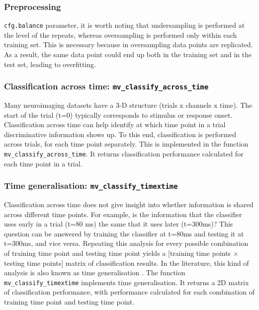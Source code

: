 \documentclass[utf8]{frontiersSCNS} %
\newcommand{\ttt}[1]{\texttt{#1}}
\begin{document}
\subsubsection{Preprocessing}\label{sec:preprocessing}

\ttt{cfg.balance} parameter, it is worth noting that undersampling is performed at the level of the repeats, whereas oversampling is performed only within each training set. This is necessary because in oversampling data points are  replicated. As a result, the same data point could end up both in the training set and in the test set, leading to overfitting.


\subsubsection{Classification across time: \ttt{mv\_classify\_across\_time}}

Many neuroimaging datasets have a 3-D structure (trials x channels x time). The start of the trial (t=0) typically corresponds to stimulus or response onset. Classification across time can help identify at which time point in a trial discriminative information shows up. To this end, classification is performed across trials, for each time point separately. This is implemented in the function \ttt{mv\_classify\_across\_time}. It returns classification performance calculated for each time point in a trial.


\subsubsection{Time generalisation: \ttt{mv\_classify\_timextime}}

Classification across time does not give insight into whether information is shared across different time points. For example, is the information that the classifier uses early in a trial (t=80 ms) the same that it uses later (t=300ms)? This question can be answered by training the classifier at t=80ms and testing it at t=300ms, and vice versa. Repeating this analysis for every possible combination of training time point and testing time point yields a [training time points $\times$ testing time points] matrix of classification results. In the literature, this kind of analysis is also known as time generalisation \cite{King2014}. The function  \ttt{mv\_classify\_timextime} implements time generalisation. It returns a 2D matrix of classification performance, with performance calculated for each combination of training time point and testing time point.
\end{document}
